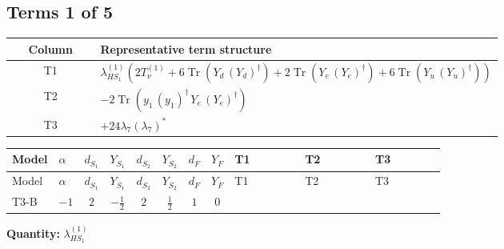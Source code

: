 \documentclass[8pt]{article}
\begin{document}
\begin{landscape}
\subsection*{Terms 1 of 5}
\begin{center}
\begin{tabular}{@{}c >{\raggedright\arraybackslash}p{0.82\linewidth}@{}}
\toprule
Column & Representative term structure \\
\midrule
T1 & \(\displaystyle {\lambda_{HS_1}^{(1)}} (2 T_{\nu}^{(1)}+6 \operatorname{Tr}\!\left({Y_d}\,\left({Y_d}\right)^{\dagger}\right)+2 \operatorname{Tr}\!\left({Y_e}\,\left({Y_e}\right)^{\dagger}\right)+6 \operatorname{Tr}\!\left({Y_u}\,\left({Y_u}\right)^{\dagger}\right))\) \\
\midrule
T2 & \(\displaystyle -2 \operatorname{Tr}\!\left({y_1}\,\left({y_1}\right)^{\dagger}\,{Y_e}\,\left({Y_e}\right)^{\dagger}\right)\) \\
\midrule
T3 & \(\displaystyle +24 {\lambda_{7}} \left({\lambda_{7}}\right)^{*}\) \\
\midrule
\bottomrule
\end{tabular}
\end{center}
\smallskip
\tiny
\begin{longtable}{@{}llcccccc >{\raggedright\arraybackslash}p{0.21\linewidth} >{\raggedright\arraybackslash}p{0.21\linewidth} >{\raggedright\arraybackslash}p{0.21\linewidth}@{}}
\toprule
Model & $\alpha$ & $d_{S_1}$ & $Y_{S_1}$ & $d_{S_2}$ & $Y_{S_2}$ & $d_F$ & $Y_F$ & T1 & T2 & T3 \\
\midrule
\endfirsthead
\toprule
Model & $\alpha$ & $d_{S_1}$ & $Y_{S_1}$ & $d_{S_2}$ & $Y_{S_2}$ & $d_F$ & $Y_F$ & T1 & T2 & T3 \\
\midrule
\endhead
T3-B & $-1$ & $2$ & $-\frac{1}{2}$ & $2$ & $\frac{1}{2}$ & $1$ & $0$ & \scriptsize\adjustbox{max width=\linewidth}{$\begin{gathered} {\lambda_{HS_1}^{(1)}} (2 T_{\nu}^{(1)}+6 \operatorname{Tr}\!\left({Y_d}\,\left({Y_d}\right)^{\dagger}\right)+2 \operatorname{Tr}\!\left({Y_e}\,\left({Y_e}\right)^{\dagger}\right)+6 \operatorname{Tr}\!\left({Y_u}\,\left({Y_u}\right)^{\dagger}\right))\end{gathered}$} & \scriptsize\adjustbox{max width=\linewidth}{$\begin{gathered} -2 \operatorname{Tr}\!\left({y_1}\,\left({y_1}\right)^{\dagger}\,{Y_e}\,\left({Y_e}\right)^{\dagger}\right)\end{gathered}$} & \scriptsize\adjustbox{max width=\linewidth}{$\begin{gathered} +24 {\lambda_{7}} \left({\lambda_{7}}\right)^{*}\end{gathered}$} \\
\midrule
\bottomrule
\end{longtable}
\clearpage
\noindent\textbf{Quantity: }$\lambda_{HS_1}^{(1)}$\par\smallskip

\end{landscape}
\end{document}
